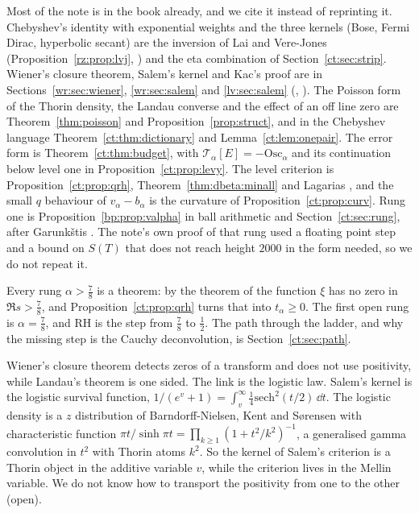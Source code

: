 Most of the note is in the book already, and we cite it instead of reprinting it. Chebyshev's identity with exponential weights and the three kernels (Bose, Fermi Dirac, hyperbolic secant) are the inversion of Lai and Vere-Jones (Proposition~\ref{rz:prop:lvj}, \cite{LVJ}) and the eta combination of Section~\ref{ct:sec:strip}. Wiener's closure theorem, Salem's kernel and Kac's proof are in Sections~\ref{wr:sec:wiener}, \ref{wr:sec:salem} and \ref{lv:sec:salem} (\cite{Wiener32}, \cite{Salem53}). The Poisson form of the Thorin density, the Landau converse and the effect of an off line zero are Theorem~\ref{thm:poisson} and Proposition~\ref{prop:struct}, and in the Chebyshev language Theorem~\ref{ct:thm:dictionary} and Lemma~\ref{ct:lem:onepair}. The error form is Theorem~\ref{ct:thm:budget}, with $\mathcal T_\alpha[E]=-\mathrm{Osc}_\alpha$ and its continuation below level one in Proposition~\ref{ct:prop:levy}. The level criterion is Proposition~\ref{ct:prop:qrh}, Theorem~\ref{thm:dbeta:minall} and Lagarias \cite{Lagarias}, and the small $q$ behaviour of $v_\alpha-b_\alpha$ is the curvature of Proposition~\ref{ct:prop:curv}. Rung one is Proposition~\ref{bp:prop:valpha} in ball arithmetic and Section~\ref{ct:sec:rung}, after Garunk\v{s}tis \cite{Garunkstis02}. The note's own proof of that rung used a floating point step and a bound on $S(T)$ that does not reach height $2000$ in the form needed, so we do not repeat it.

Every rung $\alpha>\frac78$ is a theorem: by the theorem of \cite{OAI26a} the function $\xi$ has no zero in $\Re s>\frac78$, and Proposition~\ref{ct:prop:qrh} turns that into $t_\alpha\ge0$. The first open rung is $\alpha=\frac78$, and RH is the step from $\frac78$ to $\frac12$. The path through the ladder, and why the missing step is the Cauchy deconvolution, is Section~\ref{ct:sec:path}.

\begin{remark}\label{cw:rem:logistic}
Wiener's closure theorem detects zeros of a transform and does not use positivity, while Landau's theorem is one sided. The link is the logistic law. Salem's kernel is the logistic survival function, $1/(e^v+1)=\int_v^\infty\frac14\mathrm{sech}^2(t/2)\,\dd t$. The logistic density is a $z$ distribution of Barndorff-Nielsen, Kent and S\o rensen \cite{BNKS82} with characteristic function $\pi t/\sinh\pi t=\prod_{k\ge1}(1+t^2/k^2)^{-1}$, a generalised gamma convolution in $t^2$ with Thorin atoms $k^2$. So the kernel of Salem's criterion is a Thorin object in the additive variable $v$, while the criterion lives in the Mellin variable. We do not know how to transport the positivity from one to the other (open).
\end{remark}

